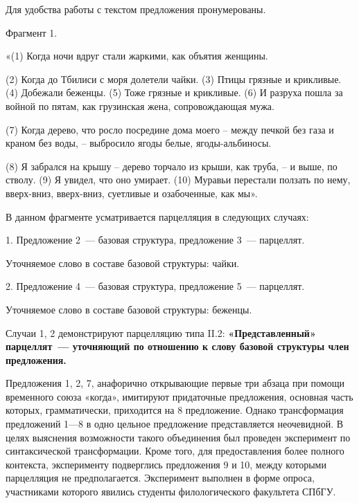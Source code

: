 \documentclass{kursa4}
\begin{document}
    Для удобства работы с текстом предложения пронумерованы.

    Фрагмент 1. 

    «(1) \textcolor[rgb]{0.2,0.2,0.2}{Когда ночи вдруг стали жаркими,
    как объятия женщины. }

    \textcolor[rgb]{0.2,0.2,0.2}{(2) Когда до Тбилиси с моря долетели
    чайки. (3) Птицы грязные и крикливые. (4) Добежали беженцы. (5) Тоже
    грязные и крикливые. (6) И разруха пошла за войной по пятам, как
    грузинская жена, сопровождающая мужа. }

    \textcolor[rgb]{0.2,0.2,0.2}{(7) Когда дерево, что росло посредине
    дома моего – между печкой без газа и краном без воды, – выбросило ягоды
    белые, ягоды-альбиносы. }

    \textcolor[rgb]{0.2,0.2,0.2}{(8) Я забрался на крышу – дерево
    торчало из крыши, как труба, – и выше, по стволу. (9) Я увидел, что оно
    умирает. (10) Муравьи перестали ползать по нему, вверх-вниз,
    вверх-вниз, суетливые и озабоченные, как мы». }


    \bigskip

    \textcolor[rgb]{0.2,0.2,0.2}{В данном фрагменте усматривается
    парцелляция в следующих случаях:}

    \textcolor[rgb]{0.2,0.2,0.2}{1. Предложение 2~--- базовая структура,
    предложение 3~--- парцеллят. }

    \textcolor[rgb]{0.2,0.2,0.2}{Уточняемое слово в составе базовой
    структуры: чайки. }

    \textcolor[rgb]{0.2,0.2,0.2}{2. Предложение 4~--- базовая структура,
    предложение 5~--- парцеллят. }

    \textcolor[rgb]{0.2,0.2,0.2}{Уточняемое слово в составе базовой
    структуры: беженцы. }

    \textcolor[rgb]{0.2,0.2,0.2}{Случаи 1, 2 демонстрируют парцелляцию
    типа II.2: }\textbf{\textcolor[rgb]{0.2,0.2,0.2}{«Представленный»
    парцеллят~--- уточняющий по отношению к слову базовой структуры член
    предложения. }}

    \textbf{\textcolor[rgb]{0.2,0.2,0.2}{}}\textcolor[rgb]{0.2,0.2,0.2}{Предложения
    1, 2, 7, анафорично открывающие первые три абзаца при помощи временного
    союза «когда», имитируют придаточные предложения, основная часть
    которых, грамматически, приходится на 8 предложение. Однако
    трансформация предложений 1—8 в одно цельное предложение представляется
    неочевидной. В целях выяснения
    }\textcolor[rgb]{0.2,0.2,0.2}{возможности}\textcolor[rgb]{0.2,0.2,0.2}{
    такого объединения был проведен эксперимент по синтаксической
    трансформации. }\textcolor[rgb]{0.2,0.2,0.2}{Кроме того, для
    предоставления более полного контекста, эксперименту подверглись
    предложения 9 и 10, между которыми парцелляция не предполагается.
    }\textcolor[rgb]{0.2,0.2,0.2}{Эксперимент выполнен в форме опроса,
    участниками которого явились студенты филологического факультета СПбГУ.
    }
\end{document}
